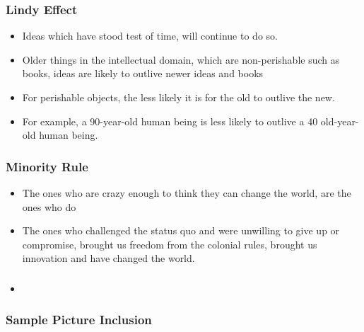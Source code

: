 \begin{frame}[fragile]\frametitle{Lindy Effect}

\begin{itemize}
\item Ideas which have stood test of time, will continue to do so.
\item Older things in the intellectual domain, which are non-perishable such as books, ideas are likely to outlive newer ideas and books
\item For perishable objects, the less likely it is for the old to outlive the new. \item For example, a 90-year-old human being is less likely to outlive a 40 old-year-old human being.
\end{itemize}
\end{frame}

\begin{frame}[fragile]\frametitle{Minority Rule}

\begin{itemize}
\item The ones who are crazy enough to think they can change the world, are the ones who do
\item The ones who challenged the status quo and were unwilling to give up or compromise, brought us freedom from the colonial rules, brought us innovation and have changed the world.
\end{itemize}
\end{frame}







\begin{frame}[fragile]\frametitle{}
\begin{itemize}
\item 
\end{itemize}
\end{frame}

\begin{frame}[fragile]\frametitle{Sample Picture Inclusion}

\end{frame}



